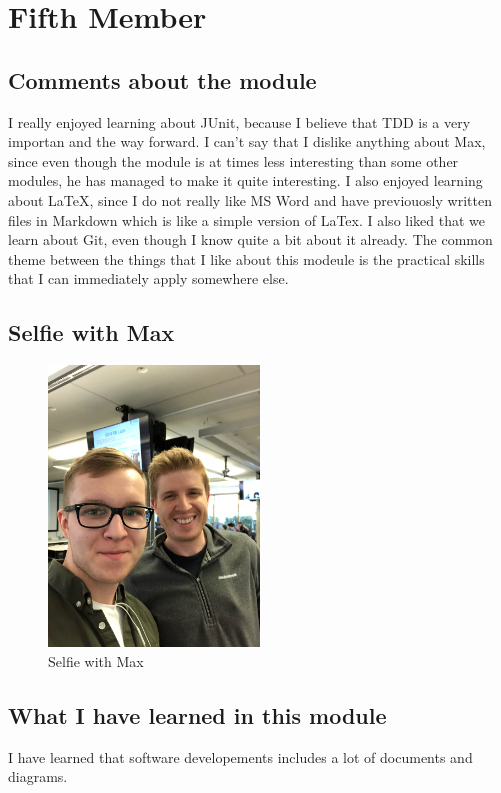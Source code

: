 \section{Fifth Member}

\subsection{Comments about the module}
I really enjoyed learning about JUnit, because I believe that TDD is a very importan and the way forward. I can't say that I dislike anything about Max, since even though the module is at times less interesting than some other modules, he has managed to make it quite interesting. I also enjoyed learning about LaTeX, since I do not really like MS Word and have previouosly written files in Markdown which is like a simple version of LaTex. I also liked that we learn about Git, even though I know quite a bit about it already. The common theme between the things that I like about this modeule is the practical skills that I can immediately apply somewhere else.

\subsection{Selfie with Max}

\begin{figure}[h]
\centering
\includegraphics[width=0.5\textwidth, angle=270]{../images/raigo_max_selfie.JPG}
\caption{Selfie with Max}
\label{fig:selfie5}
\end{figure}

\subsection{What I have learned in this module}
I have learned that software developements includes a lot of documents and diagrams.
